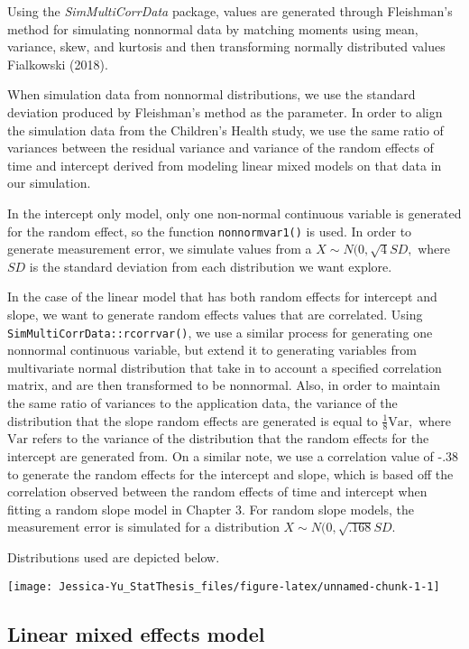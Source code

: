 \documentclass[12pt, twoside]{amherstthesis}
\begin{document}
Using the \emph{SimMultiCorrData} package, values are generated through Fleishman's method for simulating nonnormal data by matching moments using mean, variance, skew, and kurtosis and then transforming normally distributed values Fialkowski (2018).

When simulation data from nonnormal distributions, we use the standard deviation produced by Fleishman's method as the parameter. In order to align the simulation data from the Children's Health study, we use the same ratio of variances between the residual variance and variance of the random effects of time and intercept derived from modeling linear mixed models on that data in our simulation.

In the intercept only model, only one non-normal continuous variable is generated for the random effect, so the function \texttt{nonnormvar1()} is used. In order to generate measurement error, we simulate values from a \(X\sim\mathit{N}(0,\sqrt{4}SD,\) where \(SD\) is the standard deviation from each distribution we want explore.

In the case of the linear model that has both random effects for intercept and slope, we want to generate random effects values that are correlated. Using \texttt{SimMultiCorrData::rcorrvar()}, we use a similar process for generating one nonnormal continuous variable, but extend it to generating variables from multivariate normal distribution that take in to account a specified correlation matrix, and are then transformed to be nonnormal. Also, in order to maintain the same ratio of variances to the application data, the variance of the distribution that the slope random effects are generated is equal to \(\frac{1}{8}\text{Var},\) where \(\text{Var}\) refers to the variance of the distribution that the random effects for the intercept are generated from. On a similar note, we use a correlation value of -.38 to generate the random effects for the intercept and slope, which is based off the correlation observed between the random effects of time and intercept when fitting a random slope model in Chapter 3. For random slope models, the measurement error is simulated for a distribution \(X\sim\mathit{N}(0,\sqrt{.168}SD.\)

Distributions used are depicted below.
\begin{center}\texttt{[image: Jessica-Yu\_StatThesis\_files/figure-latex/unnamed-chunk-1-1]} \end{center}

\hypertarget{linear-mixed-effects-model}{%
\subsection{Linear mixed effects model}\label{linear-mixed-effects-model}}
\end{document}
